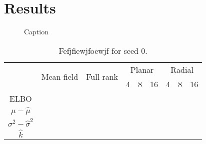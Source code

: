 \section{Results}

\begin{figure}
    \centering
    
    \caption{Caption}
    \label{fig:my_label}
\end{figure}

\begin{table}[htb]
\centering
\caption{Fefjfiewjfoewjf for seed $0$.}
\begin{tabular}{@{}cllllllll@{}}
\toprule
\multirow{2}{*}{}                       & \multicolumn{1}{c}{\multirow{2}{*}{Mean-field}} & \multicolumn{1}{c}{\multirow{2}{*}{Full-rank}} & \multicolumn{3}{c}{Planar} & \multicolumn{3}{c}{Radial} \\ \cmidrule(l){4-9} 
                                        & \multicolumn{1}{c}{}                            & \multicolumn{1}{c}{}                           & 4       & 8      & 16      & 4       & 8      & 16      \\ \midrule
ELBO                                    &                                                 &                                                &         &        &         &         &        &         \\
$\mu - \hat{\mu}$           &                                                 &                                                &         &        &         &         &        &         \\
$\sigma^2 - \hat{\sigma}^2$ &                                                 &                                                &         &        &         &         &        &         \\
$\hat{k}$                               &                                                 &                                                &         &        &         &         &        &         \\ \bottomrule
\end{tabular}
\end{table}


